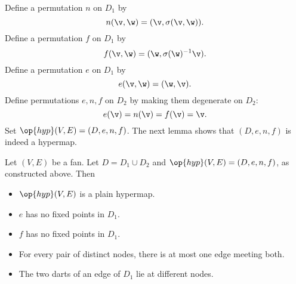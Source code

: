 Define a permutation $n$ on $D_1$ by
    $$n(\v,\w) = (\v,\sigma(\v,\w)).$$
Define a permutation $f$ on $D_1$ by
    $$
    f (\v,\w) = (\w,\sigma(\w)^{-1} \v).
    $$
Define a permutation $e$ on $D_1$ by
    $$
    e (\v,\w) = (\w,\v).
    $$
Define permutations $e,n,f$ on $D_2$ by making them degenerate on $D_2$:
    $$
    e (\v) = n(\v) = f(\v) = \v.
    $$
Set %
$\op{hyp}(V,E)=(D,e,n,f)$. %
The next lemma shows that $(D,e,n,f)$ is indeed a hypermap.



\begin{lemma}
Let $(V,E)$ be a fan.  Let $D = D_1\cup D_2$
and $\op{hyp}(V,E) = (D,e,n,f)$, as constructed above.  Then
    \begin{itemize}
    \item $\op{hyp}(V,E)$ is a plain hypermap.
    \item  $e$ has no fixed
points in $D_1$.
    \item  $f$ has no fixed points in $D_1$.
    \item For every pair of distinct nodes, there is at most one
    edge meeting both.
    \item The two darts of an edge of $D_1$ lie at different nodes.
    \end{itemize}
%
\end{lemma}

